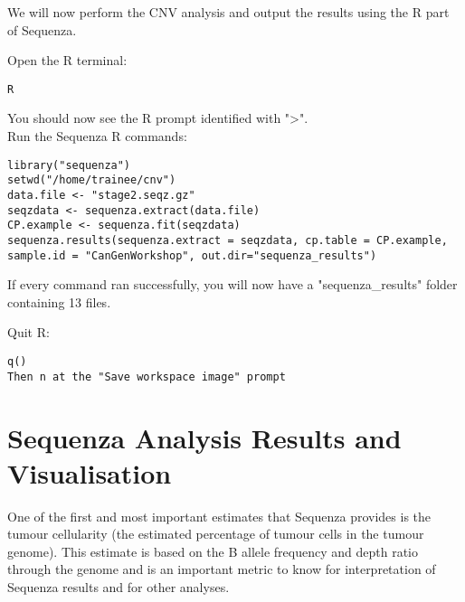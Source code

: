 We will now perform the CNV analysis and output the results using the R part of Sequenza.\\

\begin{steps}
Open the R terminal:
\begin{lstlisting}
R
\end{lstlisting}
\end{steps}

You should now see the R prompt identified with "\textgreater ".\\

Run the Sequenza R commands:
\begin{steps}
\begin{lstlisting}
library("sequenza")
setwd("/home/trainee/cnv")
data.file <- "stage2.seqz.gz"
seqzdata <- sequenza.extract(data.file)
CP.example <- sequenza.fit(seqzdata)
sequenza.results(sequenza.extract = seqzdata, cp.table = CP.example, sample.id = "CanGenWorkshop", out.dir="sequenza_results")
\end{lstlisting}
\end{steps}

If every command ran successfully, you will now have a "sequenza\_results" folder containing 13 files.\\

\begin{steps}
Quit R:
\begin{lstlisting}
q()
Then n at the "Save workspace image" prompt
\end{lstlisting}
\end{steps}


\newpage


\section{Sequenza Analysis Results and Visualisation}

One of the first and most important estimates that Sequenza provides is the tumour cellularity (the estimated percentage of tumour cells in the tumour genome). This estimate is based on the B allele frequency and depth ratio through the genome and is an important metric to know for interpretation of Sequenza results and for other analyses.\\

